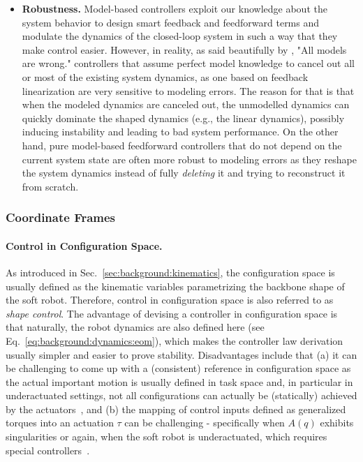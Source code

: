 \begin{itemize}
    \item \textbf{Robustness.} Model-based controllers exploit our knowledge about the system behavior to design smart feedback and feedforward terms and modulate the dynamics of the closed-loop system in such a way that they make control easier. However, in reality, as said beautifully by \citet{box1976science}, "All models are wrong." controllers that assume perfect model knowledge to cancel out all or most of the existing system dynamics, as one based on feedback linearization are very sensitive to modeling errors. The reason for that is that when the modeled dynamics are canceled out, the unmodelled dynamics can quickly dominate the shaped dynamics (e.g., the linear dynamics), possibly inducing instability and leading to bad system performance. On the other hand, pure model-based feedforward controllers that do not depend on the current system state are often more robust to modeling errors as they reshape the system dynamics instead of fully \emph{deleting} it and trying to reconstruct it from scratch.
\end{itemize}

\subsubsection{Coordinate Frames}

\paragraph{Control in Configuration Space.}
As introduced in Sec.~\ref{sec:background:kinematics}, the configuration space is usually defined as the kinematic variables parametrizing the backbone shape of the soft robot. Therefore, control in configuration space is also referred to as \emph{shape control}. The advantage of devising a controller in configuration space is that naturally, the robot dynamics are also defined here (see Eq.~\ref{eq:background:dynamics:eom}), which makes the controller law derivation usually simpler and easier to prove stability. Disadvantages include that (a) it can be challenging to come up with a (consistent) reference in configuration space as the actual important motion is usually defined in task space and, in particular in underactuated settings, not all configurations can actually be (statically) achieved by the actuators~\citep{della2025pushing}, and (b) the mapping of control inputs defined as generalized torques into an actuation $\tau$ can be challenging - specifically when $A(q)$ exhibits singularities or again, when the soft robot is underactuated, which requires special controllers~\citep{pustina2022feedback}.

